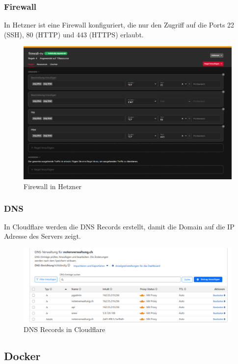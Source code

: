 \documentclass[11pt]{article}
\begin{document}
    \subsubsection{Firewall}
    In Hetzner ist eine Firewall konfiguriert, die nur den Zugriff auf die Ports 22 (SSH), 80 (HTTP) und 443 (HTTPS) erlaubt.
    \begin{figure}
        \centering
        \includegraphics[width=0.95\linewidth]{images/firewall}
        \caption{Firewall in Hetzner}
        \label{fig:firewall}
    \end{figure}

    \subsubsection{DNS}
    In Cloudflare werden die DNS Records erstellt, damit die Domain auf die IP Adresse des Servers zeigt.
    \begin{figure}
        \centering
        \includegraphics[width=0.95\linewidth]{images/dns}
        \caption{DNS Records in Cloudflare}
        \label{fig:dns}
    \end{figure}

    \subsection{Docker}
\end{document}
